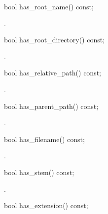 %
\begin{itemdecl}
bool has_root_name() const;
\end{itemdecl}

\begin{itemdescr}
\pnum
\returns {}.
\end{itemdescr}

%
\begin{itemdecl}
bool has_root_directory() const;
\end{itemdecl}

\begin{itemdescr}
\pnum
\returns {}.
\end{itemdescr}

%
\begin{itemdecl}
bool has_relative_path() const;
\end{itemdecl}

\begin{itemdescr}
\pnum
\returns {}.
\end{itemdescr}

%
\begin{itemdecl}
bool has_parent_path() const;
\end{itemdecl}

\begin{itemdescr}
\pnum
\returns {}.
\end{itemdescr}

%
\begin{itemdecl}
bool has_filename() const;
\end{itemdecl}

\begin{itemdescr}
\pnum
\returns {}.
\end{itemdescr}

%
\begin{itemdecl}
bool has_stem() const;
\end{itemdecl}

\begin{itemdescr}
\pnum
\returns {}.
\end{itemdescr}

%
\begin{itemdecl}
bool has_extension() const;
\end{itemdecl}

